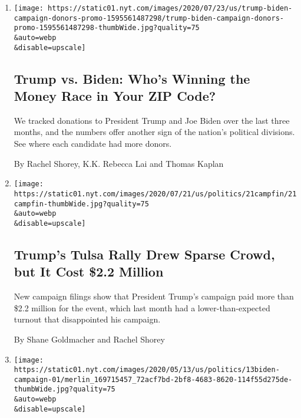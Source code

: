 \begin{enumerate}
\def\labelenumi{\arabic{enumi}.}
\item
  \href{/interactive/2020/07/24/us/politics/trump-biden-campaign-donors.html}{}

  \texttt{[image: https://static01.nyt.com/images/2020/07/23/us/trump-biden-campaign-donors-promo-1595561487298/trump-biden-campaign-donors-promo-1595561487298-thumbWide.jpg?quality=75\\\&auto=webp\\\&disable=upscale]}

  \hypertarget{trump-vs-biden-whos-winning-the-money-race-in-your-zip-code}{%
  \subsection{Trump vs. Biden: Who's Winning the Money Race in Your ZIP
  Code?}\label{trump-vs-biden-whos-winning-the-money-race-in-your-zip-code}}

  We tracked donations to President Trump and Joe Biden over the last
  three months, and the numbers offer another sign of the nation's
  political divisions. See where each candidate had more donors.

  By Rachel Shorey, K.K. Rebecca Lai and Thomas Kaplan
\item
  \href{/2020/07/21/us/politics/trump-tulsa-rally-cost.html}{}

  \texttt{[image: https://static01.nyt.com/images/2020/07/21/us/politics/21campfin/21campfin-thumbWide.jpg?quality=75\\\&auto=webp\\\&disable=upscale]}

  \hypertarget{trumps-tulsa-rally-drew-sparse-crowd-but-it-cost-22-million}{%
  \subsection{Trump's Tulsa Rally Drew Sparse Crowd, but It Cost \$2.2
  Million}\label{trumps-tulsa-rally-drew-sparse-crowd-but-it-cost-22-million}}

  New campaign filings show that President Trump's campaign paid more
  than \$2.2 million for the event, which last month had a
  lower-than-expected turnout that disappointed his campaign.

  By Shane Goldmacher and Rachel Shorey
\item
  \href{/2020/05/13/us/politics/joe-biden-donald-trump-2020.html}{}

  \texttt{[image: https://static01.nyt.com/images/2020/05/13/us/politics/13biden-campaign-01/merlin\_169715457\_72acf7bd-2bf8-4683-8620-114f55d275de-thumbWide.jpg?quality=75\\\&auto=webp\\\&disable=upscale]}


\end{enumerate}

